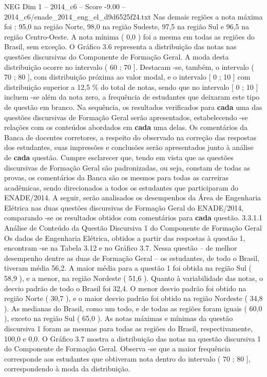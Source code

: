 \begin{textsample}{NEG Dim 1 – 2014\_c6 – Score -9.00 – 2014\_c6/enade\_2014\_eng\_el\_d9d6525f24.txt}
Nas demais regiões a nota máxima foi : 95,0 na região Norte, 98,0 na região Sudeste, 97,5 na região Sul e 96,5 na região Centro-Oeste.
A nota mínima ( 0,0 ) foi a mesma em todas as regiões do Brasil, sem exceção.
O Gráfico 3.6 representa a distribuição das notas nas questões discursivas do Componente de Formação Geral.
A moda desta distribuição ocorre no intervalo ( 60 ; 70 ].
Destacam -se, também, o intervalo ( 70 ; 80 ], com distribuição próxima ao valor modal, e o intervalo [ 0 ; 10 ] com distribuição superior a 12,5 \% do total de notas, sendo que no intervalo [ 0 ; 10 ] incluem -se além da nota zero, a frequência de estudantes que deixaram este tipo de questão em branco.
Na sequência, os resultados verificados para \textbf{cada} uma das questões discursivas de Formação Geral serão apresentados, estabelecendo -se relações com os conteúdos abordados em \textbf{cada} uma delas.
Os comentários da Banca de docentes corretores, a respeito do observado na correção das respostas dos estudantes, suas impressões e conclusões serão apresentados junto à análise de \textbf{cada} questão.
Cumpre esclarecer que, tendo em vista que as questões discursivas de Formação Geral são padronizadas, ou seja, constam de todas as provas, os comentários da Banca são os mesmos para todas as carreiras acadêmicas, sendo direcionados a todos os estudantes que participaram do ENADE/2014.
A seguir, serão analisados os desempenhos da Área de Engenharia Elétrica nas duas questões discursivas de Formação Geral do ENADE/2014, comparando -se os resultados obtidos com comentários para \textbf{cada} questão. 3.3.1.1 Análise de Conteúdo da Questão Discursiva 1 do Componente de Formação Geral Os dados de Engenharia Elétrica, obtidos a partir das respostas à questão 1, encontram -se na Tabela 3.12 e no Gráfico 3.7.
Nessa questão – de melhor desempenho dentre as duas de Formação Geral – os estudantes, de todo o Brasil, tiveram média 56,2.
A maior média para a questão 1 foi obtida na região Sul ( 58,9 ), e a menor, na região Nordeste ( 51,6 ).
Quanto à variabilidade das notas, o desvio padrão de todo o Brasil foi 32,4.
O menor desvio padrão foi obtido na região Norte ( 30,7 ), e o maior desvio padrão foi obtido na região Nordeste ( 34,8 ).
As medianas do Brasil, como um todo, e de todas as regiões foram iguais ( 60,0 ), exceto na região Sul ( 65,0 ).
As notas máximas e mínimas da questão discursiva 1 foram as mesmas para todas as regiões do Brasil, respectivamente, 100,0 e 0,0.
O Gráfico 3.7 mostra a distribuição das notas na questão discursiva 1 do Componente de Formação Geral.
Observa -se que a maior frequência corresponde aos estudantes que obtiveram nota dentro do intervalo ( 70 ; 80 ], correspondendo à moda da distribuição.

\end{textsample}
